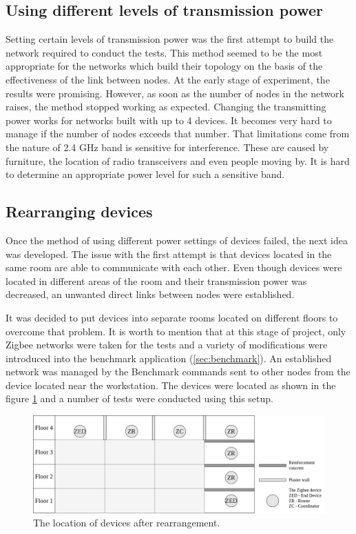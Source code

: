 \subsection*{Using different levels of transmission power}
Setting certain levels of transmission power was the first attempt
to build the network required to conduct the tests. This method seemed to be the
most appropriate for the networks which build their topology on the basis of
the effectiveness of the link between nodes. At the early stage of experiment,
the results were promising. However, as soon as the number of nodes in the 
network raises, the method stopped working as expected. Changing the 
transmitting power works for networks built with up to 4 devices. It becomes
very hard to manage if the number of nodes exceeds that number. That limitations come
from the nature of 2.4 GHz band is sensitive for interference. These are caused by
furniture, the location of radio transceivers and even people moving by. It is hard
to determine an appropriate power level for such a sensitive band.

\subsection*{Rearranging devices}
Once the method of using different power settings of devices failed, the next
idea was developed. The issue with the first attempt is that devices located
in the same room are able to communicate with each other. Even though devices
were located in different areas of the room and their transmission power was
decreased, an unwanted direct links between nodes were established.

It was decided to put devices into separate rooms located on different floors to overcome that problem. It is worth to mention that at this stage of project, only Zigbee 
networks were taken for the tests and a variety of modifications were introduced
into the benchmark application (\ref{sec:benchmark}). An 
established network was managed by the Benchmark commands sent to other nodes
from the device located near the workstation. The devices
were located as shown in the figure \ref{fig:floor_plan} and a number of
tests were conducted using this setup.

\begin{figure}[H]
    \centering
    \includegraphics[scale=0.3]{images/floor_plan2.png}
    \caption{The location of devices after rearrangement.}
    \label{fig:floor_plan}
\end{figure}

